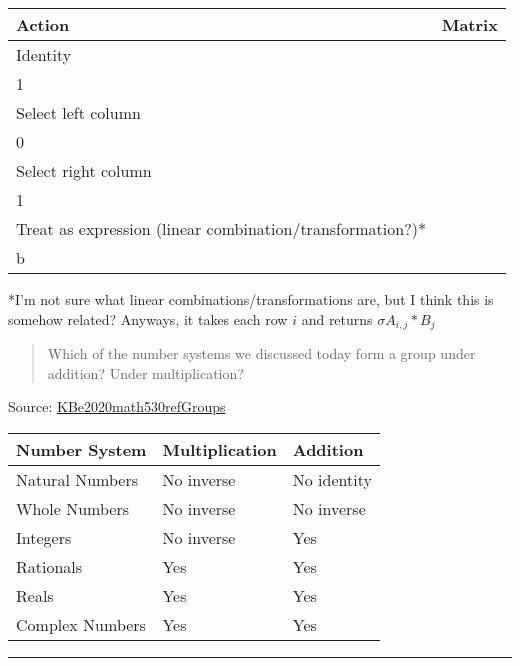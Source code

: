 \documentclass[letterpaper]{article}
\begin{document}
\begin{center}
\begin{tabular}{ll}
Action & Matrix\\
\hline
Identity & \(\begin{bmatrix} 1 \\ 1 \end{bmatrix}\)\\
Select left column & \(\begin{bmatrix} 1 \\ 0 \end{bmatrix}\)\\
Select right column & \(\begin{bmatrix} 0 \\ 1 \end{bmatrix}\)\\
Treat as expression (linear combination/transformation?)* & \(\begin{bmatrix} a \\ b \end{bmatrix}\)\\
\end{tabular}
\end{center}

*I'm not sure what linear combinations/transformations are, but I think
this is somehow related? Anyways, it takes each row \(i\) and returns
\(\sigma A_{i,j} * B_{j}\)

\begin{quote}
Which of the number systems we discussed today form a group under
addition? Under multiplication?
\end{quote}

Source: \href{KBe2020math530refGroups.org}{KBe2020math530refGroups}

\begin{center}
\begin{tabular}{lll}
Number System & Multiplication & Addition\\
\hline
Natural Numbers & No inverse & No identity\\
Whole Numbers & No inverse & No inverse\\
Integers & No inverse & Yes\\
Rationals & Yes & Yes\\
Reals & Yes & Yes\\
Complex Numbers & Yes & Yes\\
\end{tabular}
\end{center}

\noindent\rule{\textwidth}{0.5pt}
\end{document}
